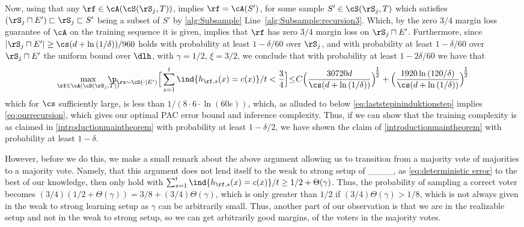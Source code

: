 Now, using that any $ \rf \in\cA(\cS(\rS_{j},T))$, implies $ \rf=\cA(S') $, for some sample $ S'\in\cS(\rS_{j},T) $ which satisfies  $ (\rS_{j}\sqcap E')\sqsubset \rS_{j}\sqsubset S'$ being a subset of $ S' $  by \cref{alg:Subsample}  Line~\ref{alg:Subsample:recursion3}. Which, by the zero $ 3/4 $ margin loss guarantee of $ \cA $ on the training sequence it is given, implies that $ \rf $ has zero $ 3/4 $ margin loss on $ \rS_{j}\sqcap E' $. Furthermore, since  $ |\rS_{j}\sqcap E'|\geq \cs(d+\ln{\left(1/\delta \right)})/960 $ holds with probability at least $ 1-\delta/60 $ over $ \rS_{j} $,  and with probability at least $1-\delta/60 $ over $ \rS_{j}\sqcap E' $ the uniform bound over $ \dlh$, with $ \gamma=1/2 $, $ \xi=3/2 $, we conclude that with probability at least $ 1-2\delta/60 $ we have that 
\vspace{-0.4cm} 
\begin{align*}
  \max_{\rf\in\cA(\cS(\rS_{j},T))}\negmedspace\negmedspace\negmedspace\negmedspace\negmedspace\negmedspace\negmedspace\p_{\rx\sim\cD(\cdot|E')}\Big[ \sum_{s=1}^{t} \ind\{h_{\rf,s}(x)=c(x)\}/t< \frac{3}{4}\Big]\negmedspace\leq\negmedspace C\Big(\frac{30720d}{\cs(d+\ln{\left(1/\delta \right)})}\Big)^{\negmedspace\tfrac{1}{2}}+\Big(\frac{1920\ln{\left(120/\delta \right)}}{\cs(d+\ln{\left(1/\delta \right)})}\Big)^{\negmedspace\tfrac{1}{2}}
  \vspace{-0.4cm}
  \end{align*}        
which for $ \cs$ sufficiently large, is less than $ 1/(8\cdot6\cdot\ln{(60 e)}) $, which, as alluded to below \cref{eq:laststepininduktionstep} implies \cref{eq:ourrecursion}, which gives our optimal PAC error bound and inference complexity. Thus, if we can show that the training complexity is as claimed in \cref{introductionmaintheorem} with probability at least $ 1-\delta/2 $, we have shown the claim of \cref{introductionmaintheorem} with probability at least $ 1-\delta $.

However, before we do this, we make a small remark about the above argument allowing us to transition from a majority vote of majorities to a majority vote. Namely, that this argument does not lend itself to the weak to strong setup of ____, as \cref{eq:deterministic error} to the best of our knowledge, then only hold with $\sum_{s=1}^{t}  \ind\{h_{\rf,s}(x)=c(x)\}/t\geq 1/2+\Theta(\gamma) $. Thus, the probability of sampling a correct voter becomes $ (3/4)(1/2+\Theta(\gamma))=3/8+(3/4)\Theta(\gamma) $, which is only greater than $ 1/2 $ if $ (3/4)\Theta(\gamma)>1/8 $, which is not always given in the weak to strong learning setup as $ \gamma $ can be arbitrarily small. Thus, another part of our observation is that we are in the realizable setup and not in the weak to strong setup, so we can get arbitrarily good margins, of the voters in the majority votes.  

